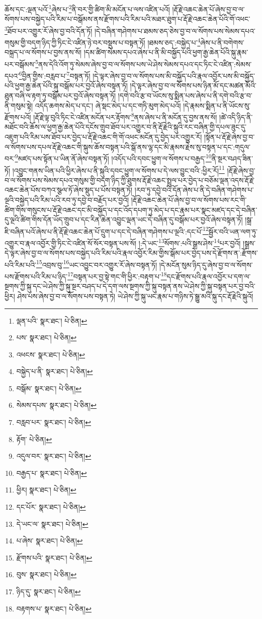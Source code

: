ཆོས་དང་:ལྡན་པའོ་\footnote{ལྡན་པའི་  སྣར་ཐང་།  པེ་ཅིན། }ཞེས་པ་\footnote{པས་  སྣར་ཐང་།  པེ་ཅིན། }ནི་བར་གྱི་ཚིག་མི་མངོན་པ་ལས་འཛིན་པའོ། །རྡོ་རྗེ་འཆང་ཆེན་པོ་ཞེས་བྱ་བ་ལ་སོགས་པས་བསྐྱེད་པའི་རིམ་པ་བསྒོམས་ནས་རྫོགས་པའི་རིམ་པའི་མཐར་ཐུག་པ་རྡོ་རྗེ་འཆང་ཆེན་པོའི་གོ་འཕང་\footnote{འཕངས་  སྣར་ཐང་།  པེ་ཅིན། }ཐོབ་པར་འགྱུར་རོ་ཞེས་བྱ་བའི་དོན་ཏོ། །དེ་བཞིན་གཤེགས་པ་ཐམས་ཅད་ཅེས་བྱ་བ་ལ་སོགས་པས་སེམས་དཔའ་གསུམ་གྱི་བདག་ཉིད་ཀྱི་ཏིང་ངེ་འཛིན་ཉེ་བར་བསྡུས་པ་བསྟན་ཏོ། །ཐམས་ཅད་:བསྐྱེད་པ་\footnote{བསྐྱེད་པ་ནི་  སྣར་ཐང་།  པེ་ཅིན། }ཞེས་པ་ནི་བགེགས་བསྐྲད་པ་ལ་སོགས་པ་བྱས་ནས་སོ། །དམ་ཚིག་སེམས་དཔའ་ཞེས་པ་ནི་མི་བསྐྱོད་པའི་ཕྱག་རྒྱ་ཆེན་པོའི་སྐུ་རྣམ་པར་བསྒོམས་\footnote{བསྒོམ་  སྣར་ཐང་།  པེ་ཅིན། }ནས་དེའི་འོག་ཏུ་སེམས་ཞེས་བྱ་བ་ལ་སོགས་པས་ཡེ་ཤེས་སེམས་དཔའ་དང་ཏིང་ངེ་འཛིན་:སེམས་དཔའ་\footnote{སེམས་དཔས་  སྣར་ཐང་།  པེ་ཅིན། }བྱིན་གྱིས་:བརླབ་པ་\footnote{བརླབ་པར་  སྣར་ཐང་།  པེ་ཅིན། }བསྟན་ཏོ། །དེ་ལྟར་ཞེས་བྱ་བ་ལ་སོགས་པས་མི་བསྐྱོད་པའི་རྣལ་འབྱོར་པས་མི་བསྐྱོད་པའི་ཕྱག་རྒྱ་ཆེན་པོའི་སྐུ་བསྒོམ་པར་བྱའོ་ཞེས་བསྟན་ཏོ། །དེ་ལྟར་ཞེས་བྱ་བ་ལ་སོགས་པས་ཉིན་མོ་དང་མཚན་མོའི་ཐུན་བཞི་ལ་རྟག་ཏུ་བསྒོམ་པར་བྱའོ་ཞེས་བསྟན་ཏོ། །དགེ་བའི་རྩ་བ་ཡོངས་སུ་སྨིན་པས་ཞེས་པ་ནི་དགེ་བའི་རྩ་བ་ནི་གསུམ་སྟེ། འདོད་ཆགས་མེད་པ་དང་། ཞེ་སྡང་མེད་པ་དང་གཏི་མུག་མེད་པའོ། །དེ་རྣམས་སྨིན་པ་ནི་ཡོངས་སུ་རྫོགས་པའོ། །རྡོ་རྗེ་ལྟ་བུའི་ཏིང་ངེ་འཛིན་མངོན་པར་རྟོགས་\footnote{རྟོག་  པེ་ཅིན། }ནས་ཞེས་པ་ནི་མངོན་དུ་བྱས་ནས་སོ། །ཚེ་འདི་ཉིད་ནི་མཐོང་བའི་ཆོས་ལ་ཕྱག་རྒྱ་ཆེན་པོའི་དངོས་གྲུབ་ཐོབ་པར་འགྱུར་བ་ནི་རྡོ་རྗེའི་སྐུའི་རང་བཞིན་གྱི་དཔལ་ཟུང་དུ་འཇུག་པའི་རིམ་པས་ཐོབ་པར་བྱེད་པ་རྡོ་རྗེ་འཆང་གི་གོ་འཕང་མངོན་དུ་བྱེད་པར་འགྱུར་རོ། །སྟོན་པ་རྡོ་རྗེ་ཞེས་བྱ་བ་ལ་སོགས་པས་དཔལ་རྡོ་རྗེ་འཆང་གི་སྐུས་ཆོས་བསྟན་པའི་སྒོ་ནས་ལྷ་དང་མི་རྣམས་རྗེས་སུ་བསྟན་པ་དང་:གདུལ་བར་\footnote{འདུལ་བར་  སྣར་ཐང་།  པེ་ཅིན། }མཛད་པས་སྟོན་པ་ཡིན་ནོ་ཞེས་བསྟན་ཏོ། །འདོད་པའི་དབང་ཕྱུག་ལ་སོགས་པ་བརྒྱད་\footnote{བརྒྱད་པ་  སྣར་ཐང་།  པེ་ཅིན། }ནི་སྔར་བཤད་ཟིན་ཏོ། །འབྱུང་གནས་ཡིན་པའི་ཕྱིར་ཞེས་པ་ནི་སྐུའི་དབང་ཕྱུག་ལ་སོགས་པ་དེ་ལས་བྱུང་བའི་:ཕྱིར་རོ།\footnote{ཕྱིར།  སྣར་ཐང་།  པེ་ཅིན། } །རྡོ་རྗེ་ཞེས་བྱ་བ་ལ་སོགས་པས་སེམས་དཔའ་གསུམ་གྱི་བདག་ཉིད་ཀྱི་ཐུགས་རྡོ་རྗེ་འཆང་སྤྲུལ་པར་བྱེད་པ་བཅོམ་ལྡན་འདས་རྡོ་རྗེ་འཆང་ཆེན་པོས་བཀའ་སྩལ་ཏོ་ཞེས་སྡུད་པ་པོས་བསྟན་ཏོ། །རབ་ཏུ་དབྱེ་བའི་དོན་ཞེས་པ་ནི་དེ་བཞིན་གཤེགས་པ་ལྔའི་བསྐྱེད་པའི་རིམ་པའི་རབ་ཏུ་དབྱེ་བ་བརྗོད་པར་བྱའོ། །རྡོ་རྗེ་འཆང་ཆེན་པོ་ཞེས་བྱ་བ་ལ་སོགས་པས་རང་གི་ཚིག་གིས་གསུངས་པ་རྡོ་རྗེ་འཆང་དང་མི་བསྐྱོད་པ་དང་འོད་དཔག་ཏུ་མེད་པ་དང་རྣམ་པར་སྣང་མཛད་དང་དེ་བཞིན་དུ་ལྔའི་ཚིག་གིས་དོན་ཡོད་གྲུབ་པ་དང་རིན་ཆེན་འབྱུང་ལྡན་ཡང་དེ་བཞིན་དུ་བསྒོམ་པར་བྱའོ་ཞེས་བསྟན་ཏོ། །སྒྲ་ཇི་བཞིན་པའོ་ཞེས་པ་ནི་རྡོ་རྗེ་འཆང་ཆེན་པོ་དྲུག་པ་དང་དེ་བཞིན་གཤེགས་པ་ལྔའི་:དང་པོ་\footnote{དང་པོར་  སྣར་ཐང་།  པེ་ཅིན། }སྦྱོར་བའི་ཡན་ལག་ཏུ་འགྱུར་བ་རྣལ་འབྱོར་གྱི་ཏིང་ངེ་འཛིན་སོ་སོར་བསྟན་པས་སོ། །:དེ་ཡང་\footnote{དེ་ཡང་ལ་  སྣར་ཐང་།  པེ་ཅིན། }སོགས་:པའི་སྒྲས་ཤེས་\footnote{པ་ཞེས་  སྣར་ཐང་།  པེ་ཅིན། }པར་བྱའོ། །སྒྲས་དེ་ལྟར་ཞེས་བྱ་བ་ལ་སོགས་པས་བསྐྱེད་པའི་རིམ་པའི་རྣལ་འབྱོར་རིམ་གྱིས་སྒོམ་པར་བྱེད་པས་དེ་རྫོགས་ན་:རྫོགས་པའི་རིམ་པའི་\footnote{རྫོགས་པའི་  སྣར་ཐང་།  པེ་ཅིན། }འབྲས་བུ་\footnote{བུས་  སྣར་ཐང་།  པེ་ཅིན། }ཡང་འབྱུང་བར་འགྱུར་རོ་ཞེས་བསྟན་ཏོ། །དེ་མངོན་སུམ་ཉིད་དུ་ཞེས་བྱ་བ་ལ་སོགས་པས་རྫོགས་པའི་རིམ་པ་ཉིད་\footnote{ཉིད་དུ་  སྣར་ཐང་།  པེ་ཅིན། }བསྟན་པར་བྱ་སྟེ་གང་གི་ཕྱིར་:བརྟག་པ་\footnote{བརྟགས་པ་  སྣར་ཐང་།  པེ་ཅིན། }དང་རྫོགས་པའི་རྣལ་འབྱོར་པ་དག་ལ་སྔགས་ཀྱི་སྐུ་དང་ཡེ་ཤེས་ཀྱི་སྐུ་སྔར་བཤད་པ་དེ་དག་ལས་སྔགས་ཀྱི་སྐུ་བསྟན་ནས་ཡེ་ཤེས་ཀྱི་སྐུ་བསྟན་པར་བྱ་བའི་ཕྱིར། ཤེས་པས་ཞེས་བྱ་བ་ལ་སོགས་པས་བསྟན་ཏེ། ཡེ་ཤེས་ཀྱི་སྐུ་ཡང་རྣམ་པ་གཉིས་ཏེ་སྒྱུ་མའི་སྐུ་དང་རྡོ་རྗེའི་སྐུའོ། 